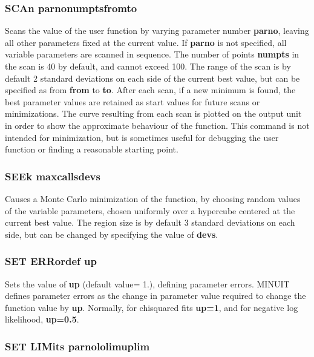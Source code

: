 \subsubsection*{SCAn \lsb parno\rsb   \lsb numpts\rsb  \lsb from\rsb   \lsb to\rsb }

Scans the value of the user function by varying parameter number
{\bf \lsb parno\rsb }, leaving all other parameters fixed at the current value.
If {\bf \lsb parno\rsb } is not specified, all variable parameters are scanned in
sequence. The number of points {\bf \lsb numpts\rsb } in the scan is 40 by default,
and cannot exceed 100.
The range of the scan is by default 2 standard deviations on each side
of the current best value, but can be specified as from
{\bf \lsb from\rsb } to {\bf \lsb to\rsb }.
After each scan, if a new minimum is found, the best parameter values
are retained as start values for future scans or minimizations.
The curve resulting from each scan is plotted on the output unit
in order to show the approximate behaviour of the function.
This command is not intended for minimization, but is sometimes useful
for debugging the user function or finding a reasonable starting point.

\subsubsection*{SEEk  \lsb maxcalls\rsb   \lsb devs\rsb }

Causes a Monte Carlo minimization of the function, by choosing
random values of the variable parameters, chosen uniformly over a
hypercube centered at the current best value.  The region size is by
default 3 standard deviations on each side, but can be changed by
specifying the value of {\bf \lsb devs\rsb }.

\subsubsection*{SET ERRordef  up}

Sets the value of {\bf up} (default value= 1.), defining parameter errors.
MINUIT defines parameter errors as the change in parameter value
required to change the function value by {\bf up}.
Normally, for chisquared fits {\bf up=1},
and for negative log likelihood, {\bf up=0.5}.

\subsubsection*{SET LIMits  \lsb parno\rsb   \lsb lolim\rsb   \lsb uplim\rsb }

